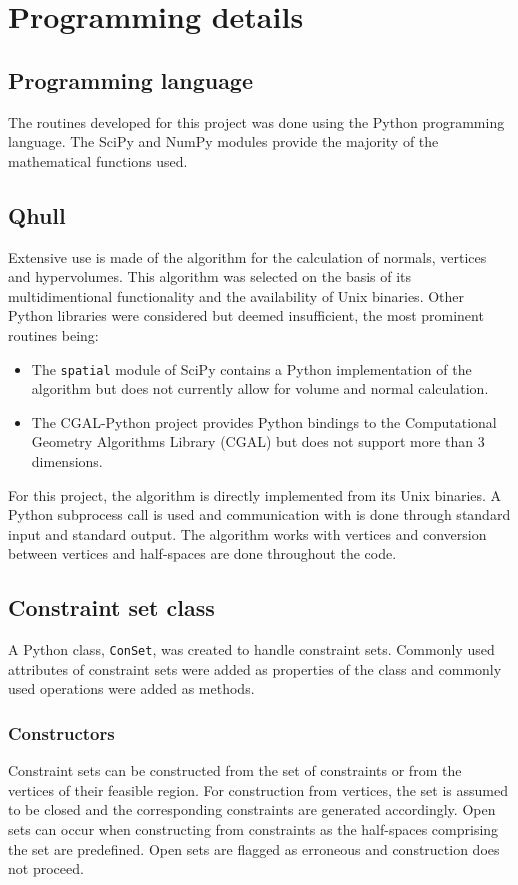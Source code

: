 \section{Programming details}

\subsection{Programming language}
The routines developed for this project was done using the Python programming language.
The SciPy and NumPy modules provide the majority of the mathematical functions used.

\subsection{Qhull}\label{sec:qhull}
Extensive use is made of the \qhull algorithm \citep{qhull} for the calculation of normals, vertices and hypervolumes.
This algorithm was selected on the basis of its multidimentional functionality and the availability of Unix binaries.
Other Python libraries were considered but deemed insufficient, the most prominent routines being:
\begin{itemize}
\item The \texttt{spatial} module of SciPy contains a Python implementation of the \qhull algorithm but does not currently allow for volume and normal calculation.
\item The CGAL-Python project \citep{cgal} provides Python bindings to the Computational Geometry Algorithms Library (CGAL) but does not support more than 3 dimensions.
\end{itemize}

For this project, the \qhull algorithm is directly implemented from its Unix binaries.
A Python subprocess call is used and communication with \qhull is done through standard input and standard output.
The \qhull algorithm works with vertices and conversion between vertices and half-spaces are done throughout the code.

\subsection{Constraint set class}
\label{sec:conclass}
A Python class, \texttt{ConSet}, was created to handle constraint sets.
Commonly used attributes of constraint sets were added as properties of the class and commonly used operations were added as methods.

\subsubsection{Constructors}
Constraint sets can be constructed from the set of constraints or from the vertices of their feasible region.
For construction from vertices, the set is assumed to be closed and the corresponding constraints are generated accordingly.
Open sets can occur when constructing from constraints as the half-spaces comprising the set are predefined.
Open sets are flagged as erroneous and construction does not proceed.

